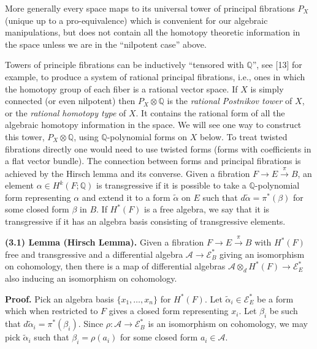 \documentclass[
  english,
  a3paper,
  a3paper]{extarticle}
\begin{document}
More generally every space maps to its universal tower of principal
fibrations \(P_X\) (unique up to a pro-equivalence) which is convenient
for our algebraic manipulations, but does not contain all the homotopy
theoretic information in the space unless we are in the ``nilpotent
case'' above.

Towers of principle fibrations can be inductively ``tensored with
\(\mathbb Q\)'', see {[}13{]} for example, to produce a system of
rational principal fibrations, i.e., ones in which the homotopy group of
each fiber is a rational vector space. If \(X\) is simply connected (or
even nilpotent) then \(P_X\otimes\mathbb Q\) is the \emph{rational
Postnikov tower} of \(X\), or the \emph{rational homotopy type} of
\(X\). It contains the rational form of all the algebraic homotopy
information in the space. We will see one way to construct this tower,
\(P_X\otimes\mathbb Q\), using \(\mathbb Q\)-polynomial forms on \(X\)
below. To treat twisted fibrations directly one would need to use
twisted forms (forms with coefficients in a flat vector bundle). The
connection between forms and principal fibrations is achieved by the
Hirsch lemma and its converse. Given a fibration
\(F\to E\xrightarrow{\pi}B\), an element \(\alpha\in H^k(F;\mathbb Q)\)
is transgressive if it is possible to take a \(\mathbb Q\)-polynomial
form representing \(\alpha\) and extend it to a form
\(\widetilde\alpha\) on \(E\) such that
\(d\widetilde\alpha=\pi^*(\beta)\) for some closed form \(\beta\) in
\(B\). If \(H^*(F)\) is a free algebra, we say that it is transgressive
if it has an algebra basis consisting of transgressive elements.

\textbf{(3.1) Lemma (Hirsch Lemma).} Given a fibration
\(F\to E\xrightarrow{\pi}B\) with \(H^*(F)\) free and transgressive and
a differential algebra \(\mathcal A\to\mathcal E_B^*\) giving an
isomorphism on cohomology, then there is a map of differential algebras
\(\mathcal A\otimes_d H^*(F)\to\mathcal E_E^*\) also inducing an
isomorphism on cohomology.

\textbf{Proof.} Pick an algebra basis \(\{x_1,\ldots,x_n\}\) for
\(H^*(F)\). Let \(\widetilde\alpha_i\in\mathcal E_E^*\) be a form which
when restricted to \(F\) gives a closed form representing \(x_i\). Let
\(\beta_i\) be such that \(d\widetilde\alpha_i=\pi^*(\beta_i)\). Since
\(\rho:\mathcal A\to\mathcal E_B^*\) is an isomorphism on cohomology, we
may pick \(\widetilde\alpha_i\) such that \(\beta_i=\rho(a_i)\) for some
closed form \(a_i\in\mathcal A\).
\end{document}
